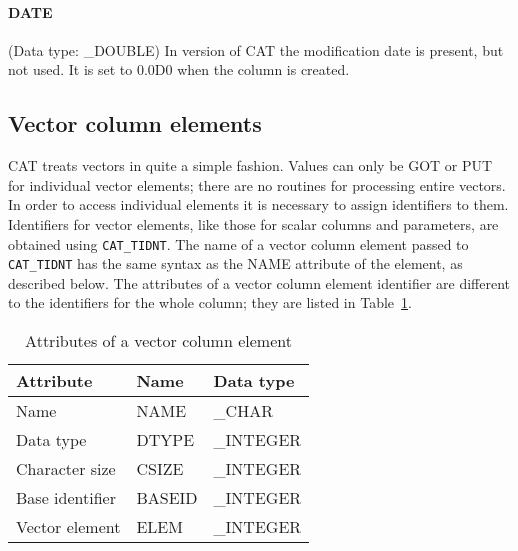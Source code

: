 \paragraph{DATE}
(Data type: \_DOUBLE)
In version \CATversion of CAT the modification date is present, but
not used. It is set to 0.0D0 when the column is created.


\subsection{\label{COLUMN_ELM}Vector column elements}

CAT treats vectors in quite a simple fashion. Values can only be GOT
or PUT for individual vector elements; there are no routines for
processing entire vectors. In order to access individual elements it
is necessary to assign identifiers to them. Identifiers for vector
elements, like those for scalar columns and parameters, are obtained
using {\tt CAT\_TIDNT}. The name of a vector column element passed to
{\tt CAT\_TIDNT} has the same syntax as the NAME attribute of the
element, as described below. The attributes of a vector column element
identifier are different to the identifiers for the whole column; they
are listed in Table~\ref{VCOL_ELEM}.

\begin{table}[htbp]

\begin{center}
\begin{tabular}{lll}
Attribute       & Name    & Data type  \\ \hline
Name            & NAME    & \_CHAR     \\
Data type       & DTYPE   & \_INTEGER  \\
Character size  & CSIZE   & \_INTEGER  \\
Base identifier & BASEID  & \_INTEGER  \\
Vector element  & ELEM    & \_INTEGER  \\
\end{tabular}
\end{center}

\caption{\label{VCOL_ELEM}Attributes of a vector column element}

\end{table}

